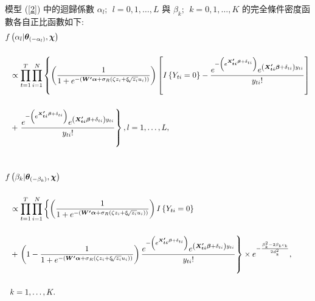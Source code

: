 \documentclass[12pt,a4paper]{article}
\begin{document}
\begin{CJK}{UTF8}{bkai}
模型 (\ref{2}) 中的迴歸係數 $\alpha_l;\:\:l=0,1,\ldots,L$ 與 $\beta_k;\:\:k=0,1,\ldots,K$ 的完全條件密度函數各自正比函數如下:
 \begin{equation*}
 \setlength\abovedisplayskip{25pt}
 \setlength\belowdisplayskip{25pt}
 \begin{split}
 f & \left(\alpha_l|\bm{\theta}_{(-\alpha_l)},\bm{\chi}\right) \\[5mm]
 & \propto \prod_{t=1}^T\prod_{i=1}^N\left\{\left(\frac{1}{1+e^{-(\bm{W^\prime}\bm{\alpha}+\sigma_R(\zeta z_i+\xi \sqrt[]{z_i} u_i))}}\right)\left[I\left\{Y_{ti} = 0 \right\}-\frac{e^{-\left(e^{\bm{X_{ti}^\prime}\bm{\beta}+\delta_{ti}}\right)}e^{\left(\bm{X_{ti}^\prime}\bm{\beta}+\delta_{ti}\right)y_{ti}}}{y_{ti}!} \right] \right .  \\[5mm]
 & + \left .\frac{e^{-\left(e^{\bm{X_{ti}^\prime}\bm{\beta}+\delta_{ti}}\right)}e^{\left(\bm{X_{ti}^\prime}\bm{\beta}+\delta_{ti}\right)y_{ti}}}{y_{ti}!} \right\} ,l=1,\dots,L,\\[10mm]
 f & \left(\beta_k|\bm{\theta}_{(-\beta_k)},\bm{\chi}\right) \\[5mm]
 & \propto \prod_{t=1}^T\prod_{i=1}^N\left\{\left(\frac{1}{1+e^{-(\bm{W^\prime}\bm{\alpha}+\sigma_R(\zeta z_i+\xi \sqrt[]{z_i} u_i))}}\right)I\left\{Y_{ti} = 0\right\} \right. \\[5mm]
 & + \left.\left(1-\frac{1}{1+e^{-(\bm{W^\prime}\bm{\alpha}+\sigma_R(\zeta z_i+\xi \sqrt[]{z_i} u_i))}}\right)\frac{e^{-\left(e^{\bm{X_{ti}^\prime}\bm{\beta}+\delta_{ti}}\right)}e^{\left(\bm{X_{ti}^\prime}\bm{\beta}+\delta_{ti}\right)y_{ti}}}{y_{ti}!} \right\} \times e^{-\frac{\beta_k^2-2\beta_kc_k}{2d_k^2}},\\[5mm]
 & k=1,\dots,K.
 \end{split}
 \end{equation*}


\end{CJK}
\end{document}
